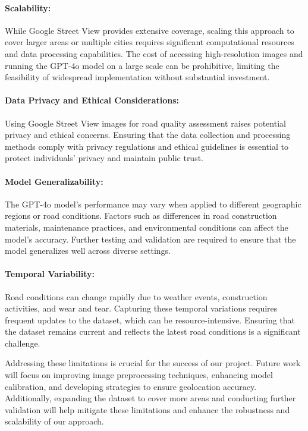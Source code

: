 \documentclass{article}
\begin{document}
\paragraph{Scalability:}
While Google Street View provides extensive coverage, scaling this approach to cover larger areas or multiple cities requires significant computational resources and data processing capabilities. The cost of accessing high-resolution images and running the GPT-4o model on a large scale can be prohibitive, limiting the feasibility of widespread implementation without substantial investment.

\paragraph{Data Privacy and Ethical Considerations:}
Using Google Street View images for road quality assessment raises potential privacy and ethical concerns. Ensuring that the data collection and processing methods comply with privacy regulations and ethical guidelines is essential to protect individuals' privacy and maintain public trust.

\paragraph{Model Generalizability:}
The GPT-4o model's performance may vary when applied to different geographic regions or road conditions. Factors such as differences in road construction materials, maintenance practices, and environmental conditions can affect the model's accuracy. Further testing and validation are required to ensure that the model generalizes well across diverse settings.

\paragraph{Temporal Variability:}
Road conditions can change rapidly due to weather events, construction activities, and wear and tear. Capturing these temporal variations requires frequent updates to the dataset, which can be resource-intensive. Ensuring that the dataset remains current and reflects the latest road conditions is a significant challenge.

Addressing these limitations is crucial for the success of our project. Future work will focus on improving image preprocessing techniques, enhancing model calibration, and developing strategies to ensure geolocation accuracy. Additionally, expanding the dataset to cover more areas and conducting further validation will help mitigate these limitations and enhance the robustness and scalability of our approach.
\end{document}
